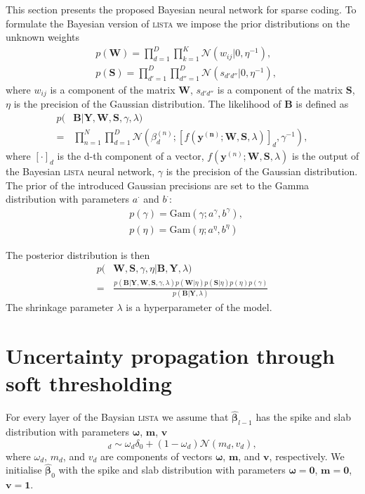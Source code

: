 \documentclass[letterpaper]{article}
\begin{document}
This section presents the proposed Bayesian neural network for sparse coding. To formulate the Bayesian version of \textsc{lista} we impose the prior distributions on the unknown weights
\begin{align}
&p(\mathbf{W}) = \prod_{d=1}^D\prod_{k=1}^K \mathcal{N}(w_{ij} | 0, \eta^{-1}), \\
&p(\mathbf{S}) = \prod_{d'=1}^D\prod_{d''=1}^D \mathcal{N}(s_{d'd''} | 0, \eta^{-1}),
\end{align}
where $w_{ij}$ is a component of the matrix $\mathbf{W}$, $s_{d'd''}$ is a component of the matrix $\mathbf{S}$, $\eta$ is the precision of the Gaussian distribution.
The likelihood of $\mathbf{B}$ is defined as 
\begin{align}
p(&\mathbf{B}| \mathbf{Y}, \mathbf{W}, \mathbf{S}, \gamma, \lambda) \nonumber \\
\label{eq:likelihood}
= &\prod_{n=1}^N\prod_{d=1}^D\mathcal{N}(\beta_d^{(n)}; [f(\mathbf{y^{(n)}}; \mathbf{W}, \mathbf{S}, \lambda)]_d, \gamma^{-1}),
\end{align}
where $[\cdot]_d$ is the d-th component of a vector, $f(\mathbf{y}^{(n)}; \mathbf{W}, \mathbf{S}, \lambda)$ is the output of the Bayesian \textsc{lista} neural network, $\gamma$ is the precision of the Gaussian distribution.
The prior of the introduced Gaussian precisions are set to the Gamma distribution with parameters $a^{\cdot}$ and $b^{\cdot}$:
\begin{align}
&p(\gamma) = \text{Gam}\left(\gamma; a^{\gamma}, b^{\gamma}\right), \\
&p(\eta) = \text{Gam}\left(\eta; 	a^{\eta}, b^{\eta}\right)
\end{align}

The posterior distribution is then
\begin{align}
p(&\mathbf{W}, \mathbf{S}, \gamma, \eta | \mathbf{B}, \mathbf{Y}, \lambda) \nonumber \\
\label{eq:posterior}
= & \frac{p(\mathbf{B} | \mathbf{Y}, \mathbf{W},  \mathbf{S}, \gamma, \lambda) p(\mathbf{W} | \eta )p(\mathbf{S} | \eta) p(\eta) p(\gamma)}{p(\mathbf{B} | \mathbf{Y}, \lambda)}
\end{align}
The shrinkage parameter $\lambda$ is a hyperparameter of the model.

\section{Uncertainty propagation through soft thresholding}
\label{sec:fprop}
For every layer of the Baysian \textsc{lista} we assume that $\widehat{\boldsymbol\beta}_{l-1}$ has the spike and slab distribution with parameters $\boldsymbol\omega$, $\mathbf{m}$, $\mathbf{v}$
\begin{equation}
[\boldsymbol\beta_{l-1}]_d \sim \omega_d \delta_0 + (1 - \omega_d)\mathcal{N}(m_d, v_d),
\end{equation}
where $\omega_d$, $m_d$, and $v_d$ are components of vectors $\boldsymbol\omega$, $\mathbf{m}$, and $\mathbf{v}$, respectively.
We initialise $\widehat{\boldsymbol\beta}_{0}$ with the spike and slab distribution with parameters $\boldsymbol\omega = \mathbf{0}$, $\mathbf{m} = \mathbf{0}$, $\mathbf{v} = \mathbf{1}$. 
\end{document}
